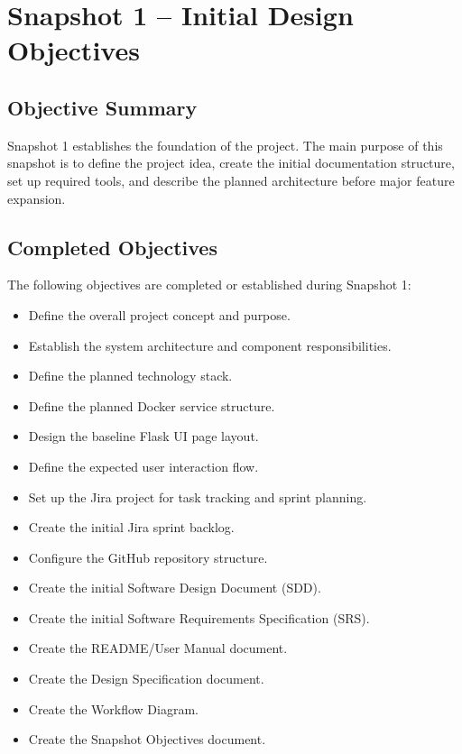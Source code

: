 \documentclass[12pt]{article}
\begin{document}
\newpage

\section{Snapshot 1 -- Initial Design Objectives}

\subsection{Objective Summary}
Snapshot 1 establishes the foundation of the project. The main purpose of this snapshot is to define the project idea, create the initial documentation structure, set up required tools, and describe the planned architecture before major feature expansion.

\subsection{Completed Objectives}
The following objectives are completed or established during Snapshot 1:

\begin{itemize}[noitemsep]
    \item Define the overall project concept and purpose.
    \item Establish the system architecture and component responsibilities.
    \item Define the planned technology stack.
    \item Define the planned Docker service structure.
    \item Design the baseline Flask UI page layout.
    \item Define the expected user interaction flow.
    \item Set up the Jira project for task tracking and sprint planning.
    \item Create the initial Jira sprint backlog.
    \item Configure the GitHub repository structure.
    \item Create the initial Software Design Document (SDD).
    \item Create the initial Software Requirements Specification (SRS).
    \item Create the README/User Manual document.
    \item Create the Design Specification document.
    \item Create the Workflow Diagram.
    \item Create the Snapshot Objectives document.
\end{itemize}
\end{document}
